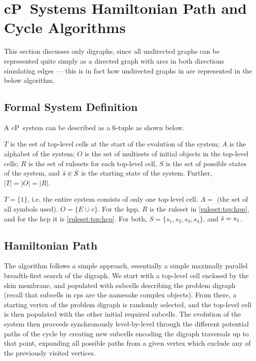 \section{\label{sec:tsp:algohpp}cP~Systems Hamiltonian Path and Cycle Algorithms}

This section discusses only digraphs, since all undirected graphs can be represented quite simply as a directed graph with arcs in both directions simulating edges --- this is in fact how undirected graphs in are represented in the below algorithm.

\subsection{Formal System Definition}
A cP~system can be described as a 6-tuple as shown below.

\cptupletemplate{}

\(T\) is the set of top-level cells at the start of the evolution of the system; \(A\) is the alphabet of the system; \(O\) is the set of multisets of initial objects in the top-level cells; \(R\) is the set of rulesets for each top-level cell, \(S\) is the set of possible states of the system, and \(\Bar{s} \in S\) is the starting state of the system. Further, \(|T| = |O| = |R|\).

\(T = \{1\}\), i.e. the entire system consists of only one top-level cell.  \(A = \) (the set of all symbols used).  \(O = \{E \cup v\}\).  For the \gls{hpp}, \(R\) is the ruleset in \autoref{ruleset:tsp:hpp}, and for the \gls{hcp} it is \autoref{ruleset:tsp:hcp}.  For both, \(S = \{s_1, s_2, s_3, s_4\}\), and \(\Bar{s} = s_1\).



\subsection{Hamiltonian Path}
The algorithm follows a simple approach, essentially a simple maximally parallel breadth-first search of the digraph.  We start with a top-level cell enclosed by the skin membrane, and populated with subcells describing the problem digraph (recall that subcells in \gls{cps} are the namesake complex objects).  From there, a starting vertex of the problem digraph is randomly selected, and the top-level cell is then populated with the other initial required subcells.  The evolution of the system then proceeds synchronously level-by-level through the different potential paths of the cycle by creating new subcells encoding the digraph traversals up to that point, expanding all possible paths from a given vertex which exclude any of the previously visited vertices.

